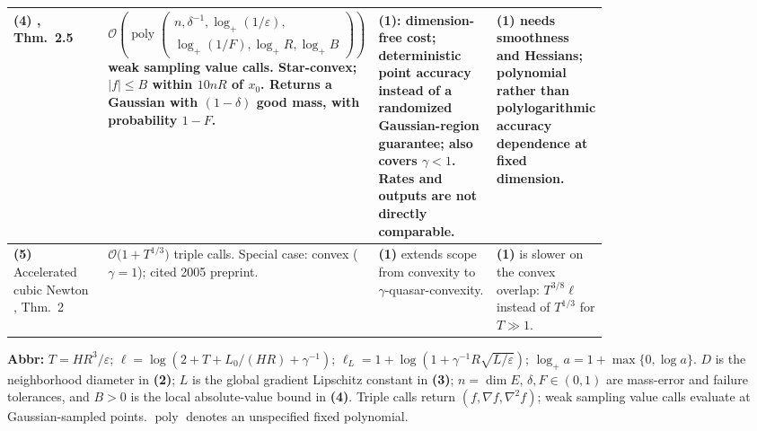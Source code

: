 \begin{table}[tp]
\begin{threeparttable}
\begin{tabularx}{\linewidth}{@{}>{\raggedright\arraybackslash}p{0.20\linewidth}>{\raggedright\arraybackslash}p{0.32\linewidth}>{\raggedright\arraybackslash}p{0.25\linewidth}>{\raggedright\arraybackslash}X@{}}
\midrule
\textbf{(4)} \citep{qchLV2016v2}, Thm.~2.5 & $\mathcal{O}\!\left(\operatorname{poly}\!\left(\begin{gathered}n,\delta^{-1},\log_+(1/\varepsilon),\\ \log_+(1/F),\log_+R,\log_+B\end{gathered}\right)\right)$ weak sampling value calls. Star-convex; $|f|\leq B$ within $10nR$ of $x_0$. Returns a Gaussian with $(1-\delta)$ good mass, with probability $1-F$. & \textbf{(1)}: dimension-free cost; deterministic point accuracy instead of a randomized Gaussian-region guarantee; also covers $\gamma<1$. Rates and outputs are not directly comparable. & \textbf{(1)} needs smoothness and Hessians; polynomial rather than polylogarithmic accuracy dependence at fixed dimension. \\
\midrule
\textbf{(5)} Accelerated cubic Newton \citep{qchNesterov2005}, Thm.~2 & $\mathcal{O}\bigl(1+T^{1/3}\bigr)$ triple calls. Special case: convex ($\gamma=1$); cited 2005 preprint. & \textbf{(1)} extends scope from convexity to $\gamma$-quasar-convexity. & \textbf{(1)} is slower on the convex overlap: $T^{3/8}\ell$ instead of $T^{1/3}$ for $T\gg1$. \\
\bottomrule
\end{tabularx}
\begin{tablenotes}[flushleft]\footnotesize
\item[] \textbf{Abbr:} $T=HR^3/\varepsilon$; $\ell=\log(2+T+L_0/(HR)+\gamma^{-1})$; $\ell_L=1+\log(1+\gamma^{-1}R\sqrt{L/\varepsilon})$; $\log_+a=1+\max\{0,\log a\}$. $D$ is the neighborhood diameter in \textbf{(2)}; $L$ is the global gradient Lipschitz constant in \textbf{(3)}; $n=\dim E$, $\delta,F\in(0,1)$ are mass-error and failure tolerances, and $B>0$ is the local absolute-value bound in \textbf{(4)}. Triple calls return $(f,\nabla f,\nabla^2f)$; weak sampling value calls evaluate at Gaussian-sampled points. $\operatorname{poly}$ denotes an unspecified fixed polynomial.
\end{tablenotes}
\end{threeparttable}
\end{table}
\clearpage
